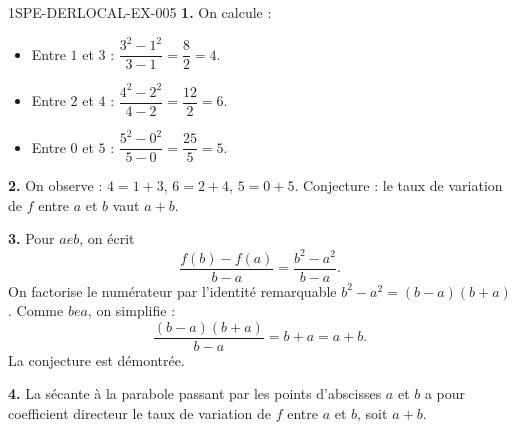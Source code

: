 \begin{corrige}{1SPE-DERLOCAL-EX-005}
\textbf{1.} On calcule :
\begin{itemize}
  \item Entre $1$ et $3$ : $\dfrac{3^2-1^2}{3-1}=\dfrac{8}{2}=4$.
  \item Entre $2$ et $4$ : $\dfrac{4^2-2^2}{4-2}=\dfrac{12}{2}=6$.
  \item Entre $0$ et $5$ : $\dfrac{5^2-0^2}{5-0}=\dfrac{25}{5}=5$.
\end{itemize}

\textbf{2.} On observe : $4=1+3$, $6=2+4$, $5=0+5$. Conjecture : le taux de variation de $f$ entre $a$ et $b$ vaut $a+b$.

\textbf{3.} Pour $a
e b$, on écrit
\[
\frac{f(b)-f(a)}{b-a}=\frac{b^2-a^2}{b-a}.
\]
On factorise le numérateur par l'identité remarquable $b^2-a^2=(b-a)(b+a)$. Comme $b
e a$, on simplifie :
\[
\frac{(b-a)(b+a)}{b-a}=b+a=a+b.
\]
La conjecture est démontrée.

\textbf{4.} La sécante à la parabole passant par les points d'abscisses $a$ et $b$ a pour coefficient directeur le taux de variation de $f$ entre $a$ et $b$, soit $a+b$.
\end{corrige}
